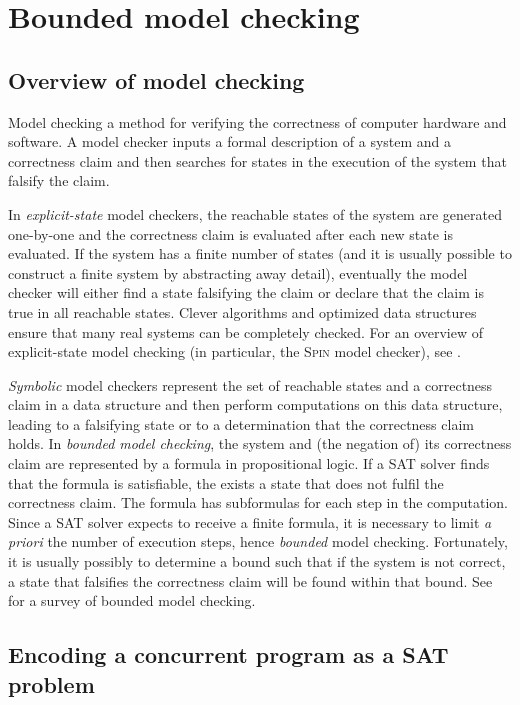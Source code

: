 \documentclass[11pt]{report}
\begin{document}
\chapter{Bounded model checking}\label{ch.model}

\section{Overview of model checking}

Model checking a method for verifying the correctness of computer
hardware and software. A model checker inputs a formal description of a
system and a correctness claim and then searches for states in the
execution of the system that falsify the claim.

In \emph{explicit-state} model checkers, the reachable states of the
system are generated one-by-one and the correctness claim is evaluated
after each new state is evaluated. If the system has a finite number of
states (and it is usually possible to construct a finite system by
abstracting away detail), eventually the model checker will either find
a state falsifying the claim or declare that the claim is true in all
reachable states. Clever algorithms and optimized data structures ensure
that many real systems can be completely checked. For an overview of
explicit-state model checking (in particular, the \textsc{Spin} model
checker), see \cite{primer}.

\emph{Symbolic} model checkers represent the set of reachable states and
a correctness claim in a data structure and then perform computations on
this data structure, leading to a falsifying state or to a determination
that the correctness claim holds. In \emph{bounded model checking}, the
system and (the negation of) its correctness claim are represented by a
formula in propositional logic. If a SAT solver finds that the formula
is satisfiable, the exists a state that does not fulfil the correctness
claim. The formula has subformulas for each step in the computation.
Since a SAT solver expects to receive a finite formula, it is necessary
to limit \textit{a priori} the number of execution steps, hence
\emph{bounded} model checking. Fortunately, it is usually possibly to
determine a bound such that if the system is not correct, a state that
falsifies the correctness claim will be found within that bound. See
\cite{bmc} for a survey of bounded model checking.

\newpage

\section{Encoding a concurrent program as a SAT problem}
\end{document}
